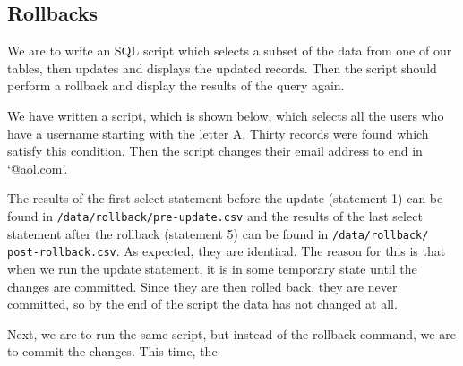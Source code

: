 \subsection{Rollbacks}

We are to write an SQL script which selects a subset of the data from one of our tables, then updates and displays the updated records. Then the script should perform a rollback and display the results of the query again.

We have written a script, which is shown below, which selects all the users who have a username starting with the letter A. Thirty records were found which satisfy this condition. Then the script changes their email address to end in `@aol.com'.


The results of the first select statement before the update (statement 1) can be found in \verb`/data/rollback/pre-update.csv` and the results of the last select statement after the rollback (statement 5) can be found in \verb`/data/rollback/` \verb`post-rollback.csv`. As expected, they are identical. The reason for this is that when we run the update statement, it is in some temporary state until the changes are committed. Since they are then rolled back, they are never committed, so by the end of the script the data has not changed at all.

Next, we are to run the same script, but instead of the rollback command, we are to commit the changes. This time, the